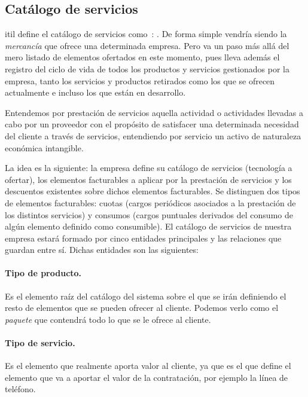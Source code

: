 \subsection{Catálogo de servicios}
\label{sub:catalogo-chap-analisis}

\acrshort{itil} define el catálogo de servicios como~\cite{catalogoITIL}:
. De forma simple vendría siendo la \textit{mercancía} que ofrece una determinada empresa. Pero va un paso más allá del mero listado de elementos ofertados en este momento, pues lleva además el registro del ciclo de vida de todos los productos y servicios gestionados por la empresa, tanto los servicios y productos retirados como los que se ofrecen actualmente e incluso los que están en desarrollo.

Entendemos por prestación de servicios aquella actividad o actividades llevadas a cabo por un proveedor con el propósito de satisfacer una determinada necesidad del cliente a través de servicios, entendiendo por servicio un activo de naturaleza económica intangible.

La idea es la siguiente: la empresa define su catálogo de servicios (tecnología a ofertar), los elementos facturables a aplicar por la prestación de servicios y los descuentos existentes sobre dichos elementos facturables. Se distinguen dos tipos de elementos facturables: cuotas (cargos periódicos asociados a la prestación de los distintos servicios) y consumos (cargos puntuales derivados del consumo de algún elemento definido como consumible).
El catálogo de servicios de nuestra empresa estará formado por cinco entidades principales y las relaciones que guardan entre sí. Dichas entidades son las siguientes:

\paragraph{Tipo de producto.} Es el elemento raíz del catálogo del sistema sobre el que se irán definiendo el resto de elementos que se pueden ofrecer al cliente. Podemos verlo como el \textit{paquete} que contendrá todo lo que se le ofrece al cliente.
\paragraph{Tipo de servicio.} Es el elemento que realmente aporta valor al cliente, ya que es el que define el elemento que va a aportar el valor de la contratación, por ejemplo la línea de teléfono.
